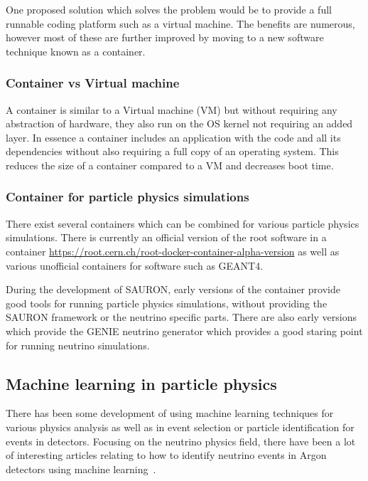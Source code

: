 One proposed solution which solves the problem would be to provide a full runnable coding platform such as a virtual machine. The benefits are numerous, however most of these are further improved by moving to a new software technique known as a container.

\subsubsection{Container vs Virtual machine}

A container is similar to a Virtual machine (VM) but without requiring any abstraction of hardware, they also run on the OS kernel not requiring an added layer. In essence a container includes an application with the code and all its dependencies without also requiring a full copy of an operating system. This reduces the size of a container compared to a VM and decreases boot time.

\subsubsection{Container for particle physics simulations}
There exist several containers which can be combined for various particle physics simulations. There is currently an official version of the root software in a container \url{https://root.cern.ch/root-docker-container-alpha-version} as well as various unofficial containers for software such as GEANT4.

During the development of SAURON, early versions of the container provide good tools for running particle physics simulations, without providing the SAURON framework or the neutrino specific parts. There are also early versions which provide the GENIE neutrino generator which provides a good staring point for running neutrino simulations.

\subsection{Machine learning in particle physics}

There has been some development of using machine learning techniques for various physics analysis as well as in event selection or particle identification for events in detectors. Focusing on the neutrino physics field, there have been a lot of interesting articles relating to how to identify neutrino events in Argon detectors using machine learning~\cite{83Radovic2018, 84Adams}. 

